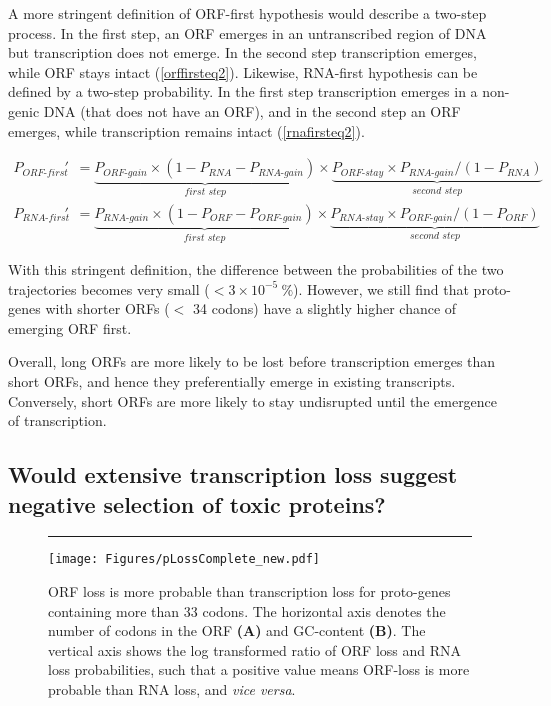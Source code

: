 \documentclass[12pt,a4paper]{article}
\begin{document}
A more stringent definition of ORF-first hypothesis would describe a two-step process. In the first step, an ORF emerges in an untranscribed region of DNA but transcription does not emerge. In the second step transcription emerges, while ORF stays intact (\autoref{orffirsteq2}). Likewise, RNA-first hypothesis can be defined by a two-step probability. In the first step transcription emerges in a non-genic DNA (that does not have an ORF), and in the second step an ORF emerges, while transcription remains intact (\autoref{rnafirsteq2}).

\begin{align}
P_\textit{ORF-first}' & = \underbrace{P_\textit{ORF-gain} \times (1-P_\textit{RNA} -P_\textit{RNA-gain})}_\textit{first step} \times \underbrace{P_\textit{ORF-stay}\times P_\textit{RNA-gain}/(1-P_\textit{RNA})}_\textit{second step} \label{orffirsteq2}\\[1em]
P_\textit{RNA-first}' & = \underbrace{P_\textit{RNA-gain} \times (1-P_\textit{ORF} -P_\textit{ORF-gain})}_\textit{first step} \times \underbrace{P_\textit{RNA-stay}\times P_\textit{ORF-gain}/(1-P_\textit{ORF})}_\textit{second step}\label{rnafirsteq2}
\end{align}

With this stringent definition, the difference between the probabilities of the two trajectories becomes very small ($< 3\times10^{-5}\ \%$). However, we still find that proto-genes with shorter ORFs ($<$ 34 codons) have a slightly higher chance of emerging ORF first.

Overall, long ORFs are more likely to be lost before transcription emerges than short ORFs, and hence they preferentially emerge in existing transcripts. Conversely, short ORFs are more likely to stay undisrupted until the emergence of transcription.

\subsection{Would extensive transcription loss suggest negative selection of toxic proteins?}


\begin{figure}[!b]
\centering
\hrule
\vspace{1ex}
\texttt{[image: Figures/pLossComplete\_new.pdf]}
\caption{ORF loss is more probable than transcription loss for proto-genes containing more than 33 codons. The horizontal axis denotes the number of codons in the ORF \textbf{(A)} and GC-content \textbf{(B)}. The vertical axis shows the log transformed ratio of ORF loss and RNA loss probabilities, such that a positive value means ORF-loss is more probable than RNA loss, and \textit{vice versa}.}
\label{lossprob}
\end{figure}
\end{document}
